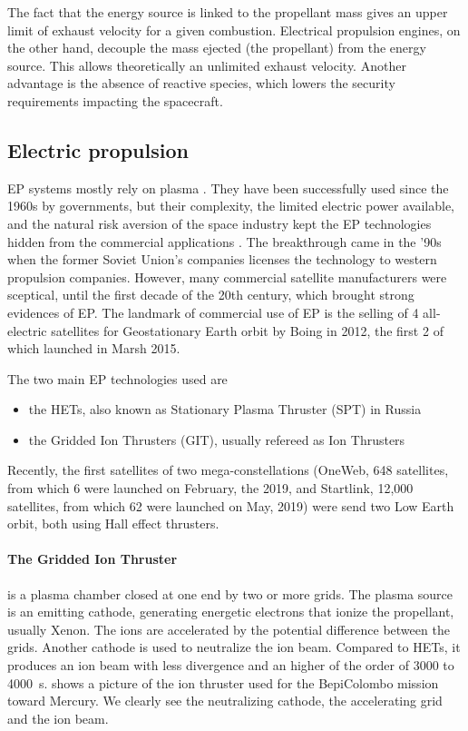 The fact that the energy source is linked to the propellant mass gives an upper limit of exhaust velocity for a given combustion.
Electrical propulsion engines, on the other hand, decouple the mass ejected (the propellant) from the energy source.
This allows theoretically an unlimited exhaust velocity.
Another advantage is the absence of reactive species, which lowers the security requirements impacting the spacecraft.

\subsection*{Electric propulsion} \label{subsec-label}
\ac{EP} systems mostly rely on plasma \citep{charles2009,mazouffre2016}.
They have been successfully used since the 1960s by governments, but their complexity, the limited electric power available, and the natural risk aversion of the space industry kept the \ac{EP} technologies hidden from the commercial applications \citep{lev2019}.
The breakthrough came in the '90s when the former Soviet Union's companies licenses the technology to western propulsion companies.
However, many commercial satellite manufacturers were sceptical, until the first decade of the 20th century, which brought strong evidences of \ac{EP}.
The landmark of commercial use of \ac{EP} is the selling of 4 all-electric satellites for Geostationary Earth orbit by Boing in 2012, the first 2 of which launched in Marsh 2015.

The two main \ac{EP} technologies used are
\begin{itemize}
  \item the \ac{HET}s, also known as Stationary Plasma Thruster (SPT) in Russia
  \item the Gridded Ion Thrusters (GIT), usually refereed as Ion Thrusters
\end{itemize}

Recently, the first satellites of two mega-constellations (OneWeb, 648 satellites, from which 6 were launched on February, the  2019, and Startlink, 12,000 satellites, from which 62 were launched on May,  2019) were send two Low Earth orbit, both using Hall effect thrusters. 


 
 \paragraph{The Gridded Ion Thruster} is a plasma chamber closed at one end by two or more grids.
 The plasma source is an emitting cathode, generating energetic electrons that ionize the propellant, usually Xenon.
 The ions are accelerated by the potential difference between the grids.
 Another cathode is used to neutralize the ion beam.
 Compared to \ac{HET}s, it produces an ion beam with less divergence and an higher \Isp of the order of 3000 to 4000~s.
  shows a picture of the ion thruster used for the BepiColombo mission toward Mercury.
 We clearly see the neutralizing cathode, the accelerating grid and the ion beam.
 
